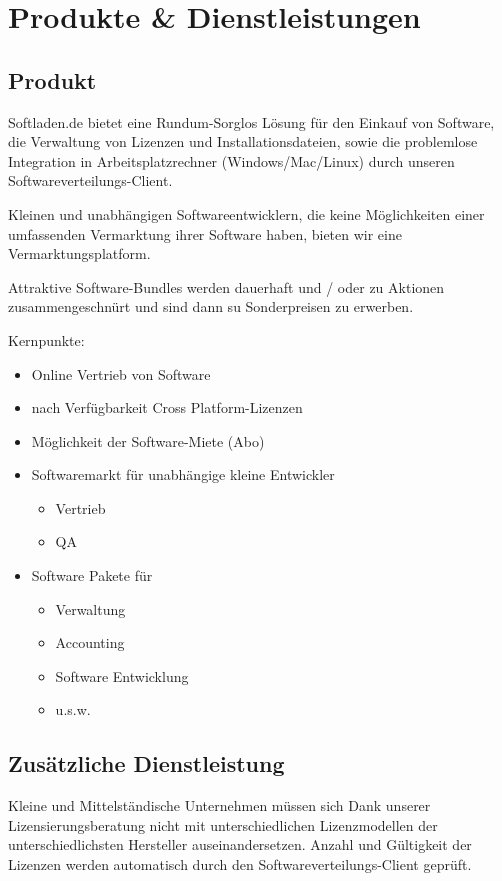 \chapter{Produkte \& Dienstleistungen}
\section{Produkt}
Softladen.de bietet eine Rundum-Sorglos L\"osung f\"ur den Einkauf von Software, die Verwaltung von Lizenzen und Installationsdateien, sowie die problemlose Integration in Arbeitsplatzrechner (Windows/Mac/Linux) durch unseren Softwareverteilungs-Client. \\ \medskip 

Kleinen und unabh\"angigen Softwareentwicklern, die keine M\"oglichkeiten einer umfassenden Vermarktung ihrer Software haben, bieten wir eine Vermarktungsplatform.\\ \medskip

Attraktive Software-Bundles werden dauerhaft und / oder zu Aktionen zusammengeschn\"urt und sind dann su Sonderpreisen zu erwerben.\\ \bigskip

Kernpunkte:\\
	\begin{itemize}
		\item Online Vertrieb von Software
		\item nach Verf\"ugbarkeit Cross Platform-Lizenzen
		\item M\"oglichkeit der Software-Miete (Abo)
		\item Softwaremarkt f\"ur unabh\"angige kleine Entwickler
		\begin{itemize}
			\item Vertrieb
			\item QA
		\end{itemize}
		\item Software Pakete f\"ur
			\begin{itemize}
				\item Verwaltung
				\item Accounting
				\item Software Entwicklung
				\item u.s.w.
			\end{itemize}
	\end{itemize}
	
\section{Zus\"atzliche Dienstleistung}
Kleine und Mittelst\"andische Unternehmen m\"ussen sich Dank unserer Lizensierungsberatung nicht mit unterschiedlichen Lizenzmodellen der unterschiedlichsten Hersteller auseinandersetzen. Anzahl und G\"ultigkeit der Lizenzen werden automatisch durch den Softwareverteilungs-Client gepr\"uft. \\ \medskip



